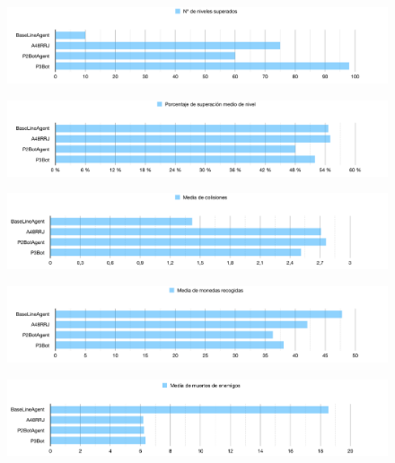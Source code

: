 \documentclass[10pt, spanish, pdftex]{../.template/template}
\begin{document}
    \begin{figure}[h!]
        \center
        \includegraphics[width=170mm]{nivsup}
        \label{nivsup}
    \end{figure}
    \begin{figure}[h!] 
        \center
        \includegraphics[width=170mm]{porcentaje}
        \label{porcentaje}
    \end{figure}
    \begin{figure}[h!] 
        \center
        \includegraphics[width=170mm]{nivel}
        \label{nivel}
    \end{figure}
    \begin{figure}[h!]
        \center
        \includegraphics[width=170mm]{monedas}
        \label{monedas}
    \end{figure}
    \begin{figure}[h!]
        \center
        \includegraphics[width=170mm]{muertes}
        \label{muertes}
    \end{figure}
    \clearpage
\end{document}
